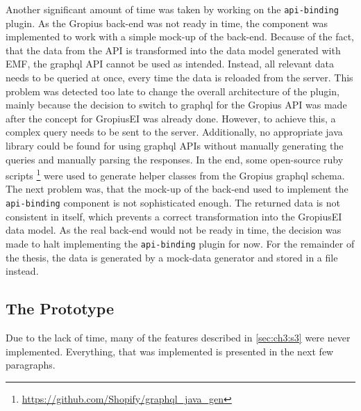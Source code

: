 Another significant amount of time was taken by working on the \lstinline|api-binding| plugin.
As the \gls{Gropius} back-end was not ready in time, the component was implemented to work with a simple mock-up of the back-end.
Because of the fact, that the data from the \gls{API} is transformed into the data model generated with \gls{EMF}, 
the \gls{graphql} \gls{API} cannot be used as intended.
Instead, all relevant data needs to be queried at once, every time the data is reloaded from the server.
This problem was detected too late to change the overall architecture of the plugin, 
mainly because the decision to switch to \gls{graphql} for the \gls{Gropius} \gls{API} was made after the concept for \gls{GropiusEI} was already done.
However, to achieve this, a complex query needs to be sent to the server.
Additionally, no appropriate \gls{java} library could be found for using \gls{graphql} \glspl{API} without manually generating the queries and manually parsing the responses. 
In the end, some open-source ruby scripts \footnote{\url{https://github.com/Shopify/graphql_java_gen}} were used to generate helper classes from the \gls{Gropius} \gls{graphql} schema.
The next problem was, that the mock-up of the back-end used to implement the \lstinline|api-binding| component is not sophisticated enough.
The returned data is not consistent in itself, which prevents a correct transformation into the \gls{GropiusEI} data model.
As the real back-end would not be ready in time, the decision was made to halt implementing the \lstinline|api-binding| plugin for now.
For the remainder of the thesis, the data is generated by a mock-data generator and stored in a file instead.

\subsection*{The Prototype}
Due to the lack of time, many of the features described in \cref{sec:ch3:s3} were never implemented.
Everything, that was implemented is presented in the next few paragraphs.

